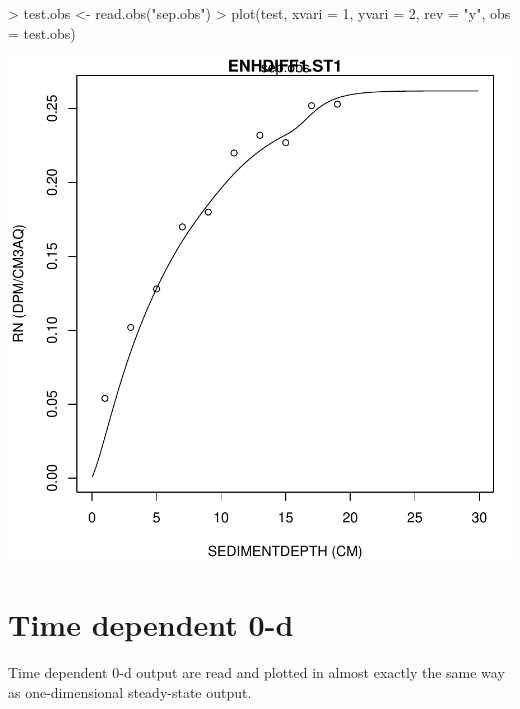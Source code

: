 \documentclass{scrartcl}
\begin{document}
\begin{Schunk}
\begin{Sinput}
> test.obs <- read.obs("sep.obs")
> plot(test, xvari = 1, yvari = 2, rev = "y", obs = test.obs)
\end{Sinput}
\end{Schunk}
\includegraphics{figures/f-004}

\section{Time dependent 0-d}

Time dependent 0-d output are read and plotted in almost exactly the
same way as one-dimensional steady-state output.  
\end{document}
